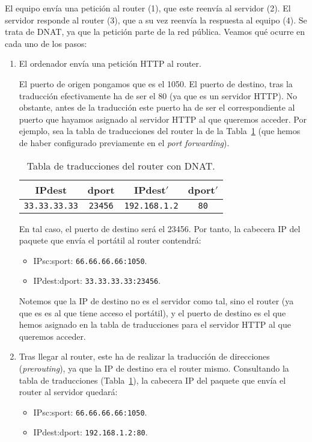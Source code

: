 \begin{ejemplo}
    El equipo envía una petición al router (1), que este reenvía al servidor (2). El servidor responde al router (3), que a su vez reenvía la respuesta al equipo (4). Se trata de \acrshort{DNAT}, ya que la petición parte de la red pública. Veamos qué ocurre en cada uno de los pasos:
    \begin{enumerate}[label=(\arabic*)]
        \item El ordenador envía una petición \acrshort{HTTP} al router.
        
        El puerto de origen pongamos que es el 1050. El puerto de destino, tras la traducción efectivamente ha de ser el 80 (ya que es un servidor \acrshort{HTTP}). No obstante, antes de la traducción este puerto ha de ser el correspondiente al puerto que hayamos asignado al servidor \acrshort{HTTP} al que queremos acceder. Por ejemplo, sea la tabla de traducciones del router la de la Tabla~\ref{tab:tabla_traducciones_DNAT} (que hemos de haber configurado previamente en el \textit{port forwarding}).
        \begin{table}[H]
            \centering
            \begin{tabular}{|c|c||c|c|}
                \hline
                IPdest & dport & IPdest$'$ & dport$'$ \\
                \hline
                \verb|33.33.33.33| & \verb|23456| & \verb|192.168.1.2| & \verb|80|\\
                \hline
            \end{tabular}
            \caption{Tabla de traducciones del router con \acrshort{DNAT}.}
            \label{tab:tabla_traducciones_DNAT}
        \end{table}

        En tal caso, el puerto de destino será el 23456. Por tanto, la cabecera IP del paquete que envía el portátil al router contendrá:
            \begin{itemize}
                \item {IPsc}:{sport}: \verb|66.66.66.66:1050|.
                \item {IPdest}:{dport}: \verb|33.33.33.33:23456|.
            \end{itemize}
        Notemos que la IP de destino no es el servidor como tal, sino el router (ya que es es al que tiene acceso el portátil), y el puerto de destino es el que hemos asignado en la tabla de traducciones para el servidor \acrshort{HTTP} al que queremos acceder.
            
        \item Tras llegar al router, este ha de realizar la traducción de direcciones (\textit{prerouting}), ya que la IP de destino era el router mismo. Consultando la tabla de traducciones (Tabla~\ref{tab:tabla_traducciones_DNAT}), la cabecera IP del paquete que envía el router al servidor quedará:
            \begin{itemize}
                \item {IPsc}:{sport}: \verb|66.66.66.66:1050|.
                \item {IPdest}:{dport}: \verb|192.168.1.2:80|.
            \end{itemize}


\end{enumerate}
\end{ejemplo}
